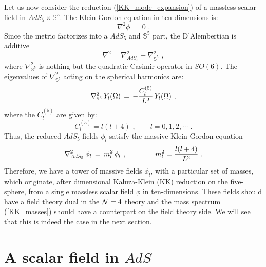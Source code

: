 \documentclass[12pt,notitlepage,a4paper]{article}
\newcommand{\beq}{\begin{equation}}
\newcommand{\eeq}{\end{equation}}
\begin{document}
Let us now consider the reduction (\ref{KK_mode_expansion}) of  a massless scalar field in $AdS_5\times {\mathbb S}^5$. The Klein-Gordon equation in ten dimensions is:
\beq
\nabla^2 \phi\,=\,0\,\,.
\eeq
Since the metric factorizes into a  $AdS_5$ and ${\mathbb S}^5$ part, the D'Alembertian is additive
\beq
\nabla^2=\nabla^2_{AdS_5}+\nabla^2_{{\mathbb S}^5}\,\,,
\eeq
where $\nabla^2_{{\mathbb S}^5}$ is nothing but the quadratic Casimir operator in
$SO(6)$. The eigenvalues of $\nabla^2_{{\mathbb S}^5}$ acting on the spherical harmonics are:
\beq
\nabla^2_{{\mathbb S}^5}\,Y_l(\Omega)\,=\,-{C_l^{(5)}\over L^2}\,Y_l(\Omega)\,\,,
\eeq
where the  $C_l^{(5)}$ are given by:
\beq
C_l^{(5)}=l(l+4)\,\,,
\qquad
l=0,1,2,\cdots\,\,.
\eeq
Thus, the reduced  $AdS_5$ fields $\phi_l$ satisfy the massive Klein-Gordon equation
\beq
\nabla^2_{AdS_5}\,\phi_l\,=\,m_l^2\,\phi_l\,\,,
\qquad\qquad
m_l^2={l(l+4)\over L^2}\,\,.
\label{KK_masses}
\eeq
Therefore, we have a tower of massive fields $\phi_l$, with a particular set of masses, which originate, after  dimensional Kaluza-Klein (KK) reduction on the five-sphere,  from a single massless scalar field $\phi$ in ten-dimensions.  These fields should have a field theory dual in the ${\cal N}=4$ theory and the mass spectrum (\ref{KK_masses}) should have a counterpart on the field theory side. We will see that this is indeed the case in the next section. 



\section{A scalar field in $AdS$}
\end{document}
